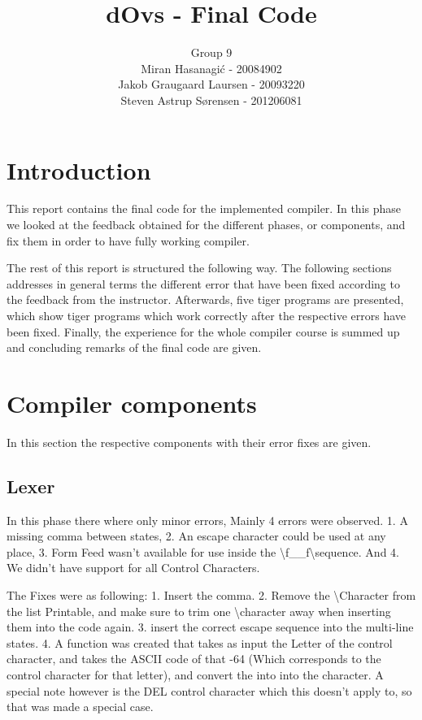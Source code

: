 \documentclass{article}
\title{dOvs - Final Code}
\author{
  Group 9 \\
  Miran Hasanagi\'{c} - 20084902 \\
  Jakob Graugaard Laursen - 20093220\\
  Steven Astrup S\o rensen - 201206081
}
\begin{document}
\maketitle

\section{Introduction}
This report contains the final code for the implemented compiler. In this phase we looked at the feedback obtained for the different phases, or components, and fix them in order to have fully working compiler. 

The rest of this report is structured the following way. The following sections addresses in general terms the different error that have been fixed according to the feedback from the instructor. Afterwards, five tiger programs are presented, which show tiger programs which work correctly after the respective errors have been fixed. Finally, the experience for the whole compiler course is summed up and concluding remarks of the final code are given.


\section{Compiler components}
In this section the respective components with their error fixes are given. 

\subsection{Lexer}
In this phase there where only minor errors, Mainly 4 errors were observed. 1. A missing comma between states, 2. An escape character could be used at any place, 3. Form Feed wasn't available for use inside the \textbackslash f__f\textbackslash sequence. And 4. We didn't have support for all Control Characters.

The Fixes were as following: 1. Insert the comma. 2. Remove the \textbackslash Character from the list {Printable}, and make sure to trim one \textbackslash character away when inserting them into the code again. 3. insert the correct escape sequence into the multi-line states. 4. A function was created that takes as input the Letter of the control character, and takes the ASCII code of that -64 (Which corresponds to the control character for that letter), and convert the into into the character. A special note however is the DEL control character which this doesn't apply to, so that was made a special case.
\end{document}
